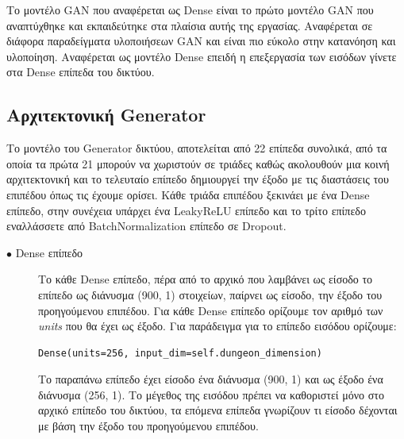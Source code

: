 Το μοντέλο GAN που αναφέρεται ως Dense είναι το πρώτο μοντέλο GAN που αναπτύχθηκε και εκπαιδεύτηκε στα πλαίσια αυτής της εργασίας. Αναφέρεται σε διάφορα παραδείγματα υλοποιήσεων GAN \cite{firstgan3} \cite{firstgan} \cite{firstgan2} και είναι πιο εύκολο στην κατανόηση και υλοποίηση. Αναφέρεται ως μοντέλο Dense επειδή η επεξεργασία των εισόδων γίνετε στα Dense επίπεδα του δικτύου.

\subsection{Αρχιτεκτονική Generator}
Το μοντέλο του Generator δικτύου, αποτελείται από 22 επίπεδα συνολικά, από τα οποία τα πρώτα 21 μπορούν να χωριστούν σε τριάδες καθώς ακολουθούν μια κοινή αρχιτεκτονική και το τελευταίο επίπεδο δημιουργεί την έξοδο με τις διαστάσεις του επιπέδου όπως τις έχουμε ορίσει. Κάθε τριάδα επιπέδου ξεκινάει με ένα Dense επίπεδο, στην συνέχεια υπάρχει ένα LeakyReLU επίπεδο \cite{leakyrelu} και το τρίτο επίπεδο εναλλάσσετε από BatchNormalization επίπεδο σε Dropout. 

\begin{description}
\item[$\bullet$ Dense επίπεδο] Το κάθε Dense επίπεδο, πέρα από το αρχικό που λαμβάνει ως είσοδο το επίπεδο ως διάνυσμα (900, 1) στοιχείων, παίρνει ως είσοδο, την έξοδο του προηγούμενου επιπέδου. Για κάθε Dense επίπεδο ορίζουμε τον αριθμό των \textit{units} που θα έχει ως έξοδο. Για παράδειγμα για το επίπεδο εισόδου ορίζουμε:
\begin{verbatim}
Dense(units=256, input_dim=self.dungeon_dimension)
\end{verbatim}
\par
Το παραπάνω επίπεδο έχει είσοδο ένα διάνυσμα (900, 1) και ως έξοδο ένα διάνυσμα (256, 1). Το μέγεθος της εισόδου πρέπει να καθοριστεί μόνο στο αρχικό επίπεδο του δικτύου, τα επόμενα επίπεδα γνωρίζουν τι είσοδο δέχονται με βάση την έξοδο του προηγούμενου επιπέδου.  \cite{dense}
\end{description}

